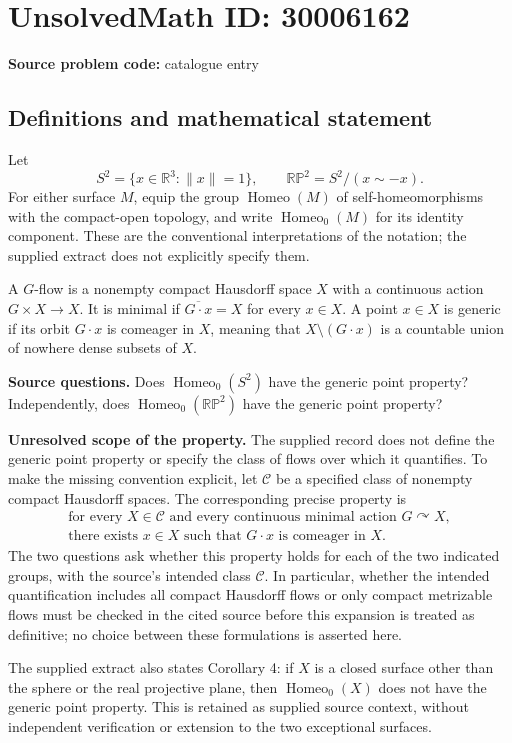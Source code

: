 \documentclass[11pt]{article}
\newcommand{\R}{\mathbb{R}}
\begin{document}
\section*{UnsolvedMath ID: 30006162}
\textbf{Source problem code:} catalogue entry
\subsection{Definitions and mathematical statement}
Let
\[
S^2=\{x\in\R^3:\|x\|=1\},\qquad
\mathbb{RP}^2=S^2/(x\sim -x).
\]
For either surface \(M\), equip the group \(\operatorname{Homeo}(M)\) of self-homeomorphisms with the compact-open topology, and write \(\operatorname{Homeo}_0(M)\) for its identity component. These are the conventional interpretations of the notation; the supplied extract does not explicitly specify them.

A \(G\)-flow is a nonempty compact Hausdorff space \(X\) with a continuous action \(G\times X\to X\). It is minimal if \(\overline{G\cdot x}=X\) for every \(x\in X\). A point \(x\in X\) is generic if its orbit \(G\cdot x\) is comeager in \(X\), meaning that \(X\setminus(G\cdot x)\) is a countable union of nowhere dense subsets of \(X\).

\textbf{Source questions.} Does \(\operatorname{Homeo}_0(S^2)\) have the generic point property? Independently, does \(\operatorname{Homeo}_0(\mathbb{RP}^2)\) have the generic point property?

\textbf{Unresolved scope of the property.} The supplied record does not define the generic point property or specify the class of flows over which it quantifies. To make the missing convention explicit, let \(\mathcal C\) be a specified class of nonempty compact Hausdorff spaces. The corresponding precise property is
\[
\begin{gathered}
\text{for every }X\in\mathcal C\text{ and every continuous minimal action }G\curvearrowright X,\\
\text{there exists }x\in X\text{ such that }G\cdot x\text{ is comeager in }X.
\end{gathered}
\]
The two questions ask whether this property holds for each of the two indicated groups, with the source's intended class \(\mathcal C\). In particular, whether the intended quantification includes all compact Hausdorff flows or only compact metrizable flows must be checked in the cited source before this expansion is treated as definitive; no choice between these formulations is asserted here.

The supplied extract also states Corollary 4: if \(X\) is a closed surface other than the sphere or the real projective plane, then \(\operatorname{Homeo}_0(X)\) does not have the generic point property. This is retained as supplied source context, without independent verification or extension to the two exceptional surfaces.
\end{document}
